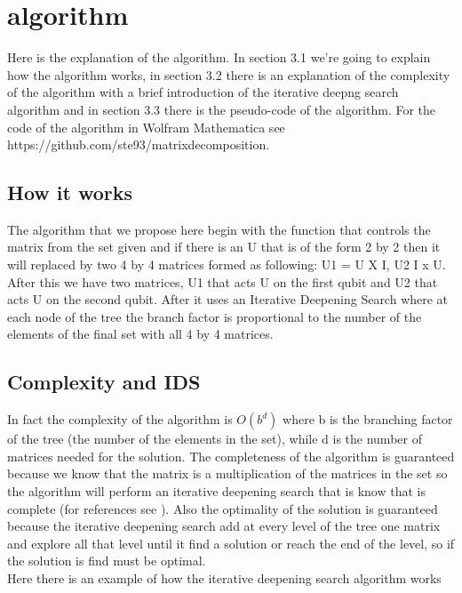 \documentclass{amsart}
\begin{document}
\section{algorithm}
Here is the explanation of the algorithm. In section 3.1 we're going to explain how the algorithm works, in section 3.2 there is an explanation of the complexity of the algorithm with a brief introduction of the iterative deepng search algorithm and in section 3.3 there is the pseudo-code of the algorithm.
For the code of the algorithm in Wolfram Mathematica see https://github.com/ste93/matrixdecomposition. \\
\subsection{How it works}
The algorithm that we propose here begin with the function that controls the matrix from the set given and if there is an U that is of the form 2 by 2 then it will replaced by two 4 by 4 matrices formed as following:
U1 = U X I, U2 I x U. After this we have two matrices, U1 that acts U on the first qubit and U2 that acts U on the second qubit.
After it uses an Iterative Deepening Search where at each node of the tree the branch factor is proportional to the number of the elements of the final set with all 4 by 4 matrices.\\

\subsection{Complexity and IDS}
In fact the complexity of the algorithm is $O(b^d)$ where b is the branching factor of the tree (the number of the elements in the set), while d is the number of matrices needed for the solution.
The completeness of the algorithm is guaranteed because we know that the matrix is a multiplication of the matrices in the set so the algorithm will perform an iterative deepening search that is know that is complete (for references see ).
Also the optimality of the solution is guaranteed because the iterative deepening search add at every level of the tree one matrix and explore all that level until it find a solution or reach the end of the level, so if the solution is find must be optimal.\\


Here there is an example of how the iterative deepening search algorithm works\\\\
\end{document}
